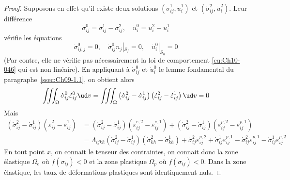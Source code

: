 \begin{proof}
    Supposons en effet qu'il existe deux solutions $\left( \dot{\sigma}_{ij}^1, \dot{u}_i^1 \right)$ et $\left( \dot{\sigma}_{ij}^2, \dot{u}_i^2 \right)$.
    Leur différence
    \begin{equation}
        \dot{\sigma}_{ij}^0 = \dot{\sigma}_{ij}^1 -  \dot{\sigma}_{ij}^2, \quad \dot{u}_i^0 = \dot{u}_i^2 - \dot{u}_i^1
        \label{eq:Ch10-047}
    \end{equation}
    vérifie les équations 
    \begin{equation}
        \dot{\sigma}_{ij,j}^0 = 0, \quad \dot{\sigma}_{ij}^0 n_j|_{S_f} = 0, \quad \dot{u}_i^0 |_{S_u} = 0
        \label{eq:Ch10-048}
    \end{equation}
    (Par contre, elle ne vérifie pas nécessairement la loi de comportement \eqref{eq:Ch10-046} qui est non linéaire).
    En appliquant à $\dot{\sigma}_{ij}^0$ et $\dot{u}_i^0$ le lemme fondamental du paragraphe~\ref{ssec:Ch09-1.1}, on obtient alors 
    \begin{equation}
        \iiint_{\Omega} \dot{\sigma}_{ij}^0 \dot{\varepsilon}_{ij}^0 \ud v = \iiint_{\Omega} \left( \dot{\sigma}_{ij}^2 - \dot{\sigma}_{ij}^1 \right)\left( \dot{\varepsilon}_{ij}^2 - \dot{\varepsilon}_{ij}^1 \right) \ud v = 0
        \label{eq:Ch10-049}
    \end{equation}
    Mais
    \[
    \begin{aligned}
        \left( \dot{\sigma}_{ij}^2 - \dot{\sigma}_{ij}^1 \right)\left( \dot{\varepsilon}_{ij}^2 - \dot{\varepsilon}_{ij}^1 \right) & = \left( \dot{\sigma}_{ij}^2 - \dot{\sigma}_{ij}^1 \right) \left( \dot{\varepsilon}_{ij}^{e,2} - \dot{\varepsilon}_{ij}^{e,1} \right) + \left( \dot{\sigma}_{ij}^2 - \dot{\sigma}_{ij}^1 \right)\left( \dot{\varepsilon}_{ij}^{p,2} - \dot{\varepsilon}_{ij}^{p,1} \right) \\
        & = \Lambda_{ijkh} \left( \dot{\sigma}_{ij}^2 - \dot{\sigma}_{ij}^1 \right) \left( \dot{\sigma}_{kh}^2 - \dot{\sigma}_{kh}^1 \right) + \dot{\sigma}_{ij}^2 \dot{\varepsilon}_{ij}^{p,2} + \dot{\sigma}_{ij}^1 \dot{\varepsilon}_{ij}^{p,1} - \dot{\sigma}_{ij}^2 \dot{\varepsilon}_{ij}^{p,1} - \dot{\sigma}_{ij}^1 \dot{\varepsilon}_{ij}^{p,2}
    \end{aligned}
    \]
    En tout point $x$, on connait le tenseur des contraintes, on connait donc la zone élastique $\Omega_e$ où $f\left( \sigma_{ij} \right) < 0$ et la zone plastique $\Omega_p$ où $f\left( \sigma_{ij} \right) < 0$. 
    Dans la zone élastique, les taux de déformations plastiques sont identiquement nuls.

\end{proof}
